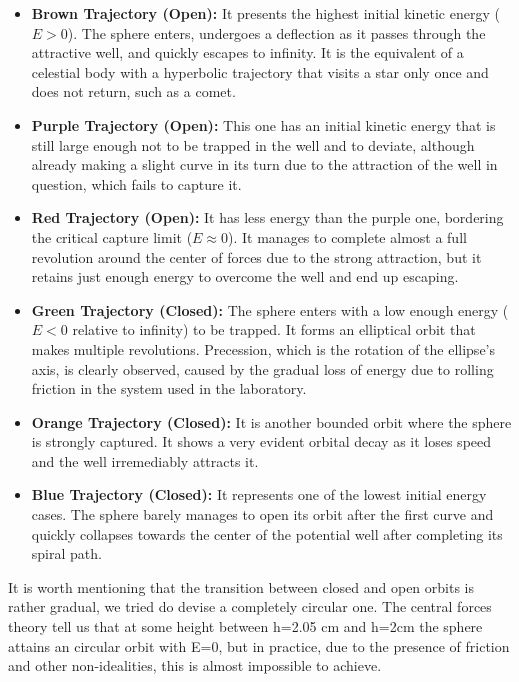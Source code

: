 \documentclass[a4paper,11pt]{article}
\begin{document}
\begin{itemize}
    \item \textbf{Brown Trajectory (Open):} It presents the highest initial kinetic energy ($E > 0$). The sphere enters, undergoes a deflection as it passes through the attractive well, and quickly escapes to infinity. It is the equivalent of a celestial body with a hyperbolic trajectory that visits a star only once and does not return, such as a comet.

    \item \textbf{Purple Trajectory (Open):} This one has an initial kinetic energy that is still large enough not to be trapped in the well and to deviate, although already making a slight curve in its turn due to the attraction of the well in question, which fails to capture it.

    \item \textbf{Red Trajectory (Open):} It has less energy than the purple one, bordering the critical capture limit ($E \approx 0$). It manages to complete almost a full revolution around the center of forces due to the strong attraction, but it retains just enough energy to overcome the well and end up escaping. 

    \item \textbf{Green Trajectory (Closed):} The sphere enters with a low enough energy ($E < 0$ relative to infinity) to be trapped. It forms an elliptical orbit that makes multiple revolutions. Precession, which is the rotation of the ellipse's axis, is clearly observed, caused by the gradual loss of energy due to rolling friction in the system used in the laboratory. 

    \item \textbf{Orange Trajectory (Closed):} It is another bounded orbit where the sphere is strongly captured. It shows a very evident orbital decay as it loses speed and the well irremediably attracts it.

    \item \textbf{Blue Trajectory (Closed):} It represents one of the lowest initial energy cases. The sphere barely manages to open its orbit after the first curve and quickly collapses towards the center of the potential well after completing its spiral path.
\end{itemize}


It is worth mentioning that the transition between closed and open orbits is rather gradual, we tried do devise a completely circular one. The central forces theory %
tell us that at some height between h=2.05 cm and h=2cm the sphere attains an circular orbit with E=0, but in practice, due to the presence of friction and other non-idealities, this is almost impossible to achieve.
\end{document}
